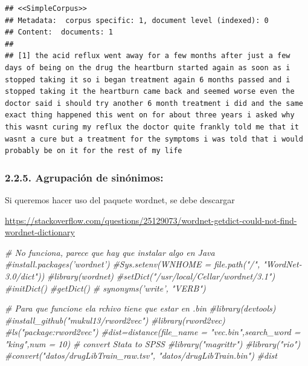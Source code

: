 \documentclass[spanish,]{article}
\newenvironment{Shaded}{\begin{snugshade}}{\end{snugshade}}
\newcommand{\CommentTok}[1]{\textcolor[rgb]{0.56,0.35,0.01}{\textit{#1}}}
\begin{document}
\begin{verbatim}
## <<SimpleCorpus>>
## Metadata:  corpus specific: 1, document level (indexed): 0
## Content:  documents: 1
## 
## [1] the acid reflux went away for a few months after just a few days of being on the drug the heartburn started again as soon as i stopped taking it so i began treatment again 6 months passed and i stopped taking it the heartburn came back and seemed worse even the doctor said i should try another 6 month treatment i did and the same exact thing happened this went on for about three years i asked why this wasnt curing my reflux the doctor quite frankly told me that it wasnt a cure but a treatment for the symptoms i was told that i would probably be on it for the rest of my life
\end{verbatim}

\hypertarget{agrupacion-de-sinonimos}{%
\subsubsection{2.2.5. Agrupación de
sinónimos:}\label{agrupacion-de-sinonimos}}

Si queremos hacer uso del paquete wordnet, se debe descargar

\url{https://stackoverflow.com/questions/25129073/wordnet-getdict-could-not-find-wordnet-dictionary}

\begin{Shaded}
\begin{Highlighting}[]
\CommentTok{# No funciona, parece que hay que instalar algo en Java}
\CommentTok{#install.packages('wordnet')}
\CommentTok{#Sys.setenv(WNHOME = file.path("/", "WordNet-3.0/dict"))}
\CommentTok{#library(wordnet)}
\CommentTok{#setDict("/usr/local/Cellar/wordnet/3.1")}
\CommentTok{#initDict()}
\CommentTok{#getDict()}
\CommentTok{# synonyms(’write’, "VERB")}
\end{Highlighting}
\end{Shaded}

\begin{Shaded}
\begin{Highlighting}[]
\CommentTok{# Para que funcione ela rchivo tiene que estar en .bin}
\CommentTok{#library(devtools)}
\CommentTok{#install_github("mukul13/rword2vec")}
\CommentTok{#library(rword2vec)}
\CommentTok{#ls("package:rword2vec")}
\CommentTok{#dist=distance(file_name = "vec.bin",search_word = "king",num = 10)}
\CommentTok{# convert Stata to SPSS}
\CommentTok{#library("magrittr")}
\CommentTok{#library("rio")}
\CommentTok{#convert("datos/drugLibTrain_raw.tsv", "datos/drugLibTrain.bin")}
\CommentTok{#dist}
\end{Highlighting}
\end{Shaded}
\end{document}

